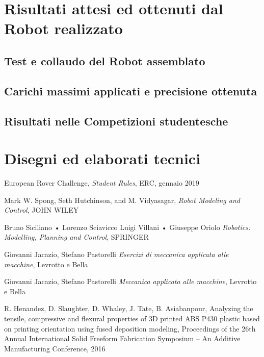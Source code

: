 \documentclass[%
corpo=11pt,
twoside,
 stile=classica,
oldstyle,
greek,%
]{toptesi}
\begin{document}
\chapter{Risultati attesi ed ottenuti dal Robot realizzato}
	\section{Test e collaudo del Robot assemblato}
	\section{Carichi massimi applicati e precisione ottenuta}
	\section{Risultati nelle Competizioni studentesche }

\backmatter
\chapter{Disegni ed elaborati tecnici}







\begin{thebibliography}{9}
 European Rover Challenge, \emph{Student Rules}, ERC, gennaio 2019

Mark W. Spong, Seth Hutchinson, and M. Vidyasagar, \emph{Robot Modeling and Control}, JOHN WILEY  

Bruno Siciliano • Lorenzo Sciavicco Luigi Villani • Giuseppe Oriolo \emph{Robotics: Modelling, Planning and Control}, SPRINGER

Giovanni Jacazio, Stefano Pastorelli \emph{Esercizi di meccanica applicata alle macchine}, Levrotto e Bella

Giovanni Jacazio, Stefano Pastorelli \emph{Meccanica applicata alle macchine}, Levrotto e Bella

 R. Henandez, D. Slaughter, D. Whaley, J. Tate, B. Asiabanpour, Analyzing the tensile, compressive and flexural properties of 3D printed ABS P430 plastic based on printing orientation using fused deposition modeling, Proceedings of the 26th Annual International Solid Freeform Fabrication Symposium – An Additive Manufacturing Conference, 2016
\end{thebibliography}
\end{document}
